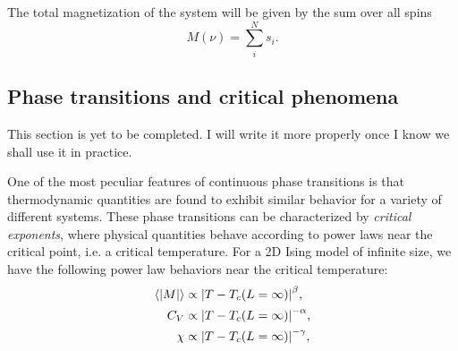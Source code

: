 The total magnetization of the system will be given by the sum over all spins 
\begin{equation}\label{eq:total_magnetization}
    M(\nu) = \sum_{i}^N s_i.
\end{equation}

\subsection{Phase transitions and critical phenomena}\label{subsec_theory:PT_critical_phenomena}
\alert{This section is yet to be completed. I will write it more properly once I know we shall use it in practice.}

One of the most peculiar features of continuous phase transitions is that thermodynamic quantities are found to exhibit similar behavior for a variety of different systems. These phase transitions can be characterized by \textit{critical exponents}, where physical quantities behave according to power laws near the critical point, i.e. a critical temperature.  For a 2D Ising model of infinite size, we have the following power law behaviors near the critical temperature: 
\begin{align}
    \expval{\abs{M}} & \propto \abs{T - T_c(L=\infty)}^\beta, \label{eq:crit_expo_mag} \\
    C_V & \propto \abs{T - T_c(L=\infty)}^{-\alpha}, \label{eq:crit_expo_heatcap} \\ 
    \chi & \propto \abs{T - T_c(L=\infty)}^{-\gamma}, \label{eq:crit_expo_mag_susc} \\ 
\end{align}


